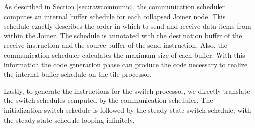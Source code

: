 As described in Section \ref{sec:rawcommunic}, the communication
scheduler computes an internal buffer schedule for each collapsed
Joiner node.  This schedule exactly describes the order in which to
send and receive data items from within the Joiner.  The schedule is
annotated with the destination buffer of the receive instruction and
the source buffer of the send instruction.  Also, the communication
scheduler calculates the maximum size of each buffer.  With this
information the code generation phase can produce the code necessary
to realize the internal buffer schedule on the tile processor.

Lastly, to generate the instructions for the switch processor, we
directly translate the switch schedules computed by the communication
scheduler.  The initialization switch schedule is followed by the steady
state switch schedule, with the steady state schedule looping infinitely.
